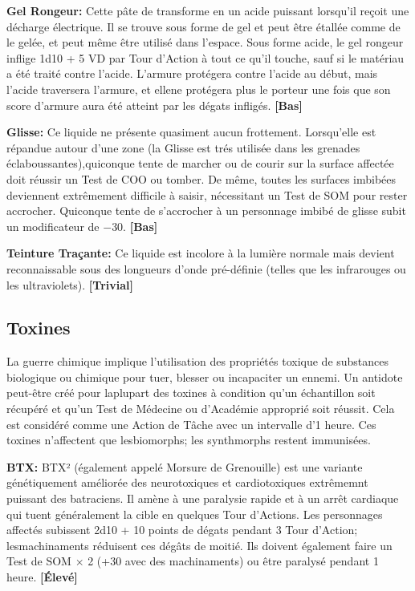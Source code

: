 \textbf{Gel Rongeur:} Cette pâte de transforme en un acide puissant lorsqu'il reçoit une décharge électrique. Il se trouve sous forme de gel et peut être étallée comme de le gelée, et peut même être utilisé dans l'espace. Sous forme acide, le gel rongeur inflige 1d10 + 5 VD par Tour d'Action à tout ce qu'il touche, sauf si le matériau a été traité contre l'acide. L'armure protégera contre l'acide au début, mais l'acide traversera l'armure, et ellene protégera plus le porteur une fois que son score d'armure aura été atteint par les dégats infligés. \textbf{[Bas]} 

\textbf{Glisse:} Ce liquide ne présente quasiment aucun frottement. Lorsqu'elle est répandue autour d'une zone (la Glisse est trés utilisée dans les grenades éclaboussantes),quiconque tente de marcher ou de courir sur la surface affectée doit réussir un Test de COO ou tomber. De même, toutes les surfaces imbibées deviennent extrêmement difficile à saisir, nécessitant un Test de SOM pour rester accrocher. Quiconque tente de s'accrocher à un personnage imbibé de glisse subit un modificateur de $-$30. \textbf{[Bas]} 

\textbf{Teinture Traçante:} Ce liquide est incolore à la lumière normale mais devient reconnaissable sous des longueurs d'onde pré-définie (telles que les infrarouges ou les ultraviolets). \textbf{[Trivial]} 

\subsection{Toxines} \label{sec:toxins} 

La guerre chimique implique l'utilisation des propriétés toxique de substances biologique ou chimique pour tuer, blesser ou incapaciter un ennemi. Un antidote peut-être créé pour laplupart des toxines à condition qu'un échantillon soit récupéré et qu'un Test de Médecine ou d'Académie approprié soit réussit. Cela est considéré comme une Action de Tâche avec un intervalle d'1 heure. Ces toxines n'affectent que lesbiomorphs; les synthmorphs restent immunisées. 

\textbf{BTX:} BTX² (également appelé Morsure de Grenouille) est une variante génétiquement améliorée des neurotoxiques et cardiotoxiques extrêmemnt puissant des batraciens. Il amène à une paralysie rapide et à un arrêt cardiaque qui tuent généralement la cible en quelques Tour d'Actions. Les personnages affectés subissent 2d10 + 10 points de dégats pendant 3 Tour d'Action; lesmachinaments réduisent ces dégâts de moitié. Ils doivent également faire un Test de SOM $\times$ 2 (+30 avec des machinaments) ou être paralysé pendant 1 heure. \textbf{[Élevé]} 

